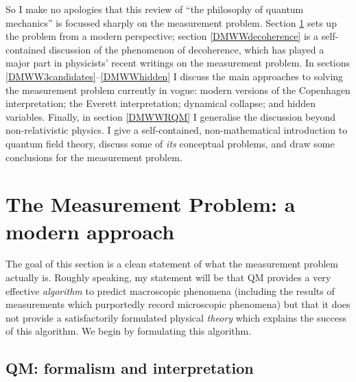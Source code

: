 \documentclass[12pt]{article}
\begin{document}
So I make no apologies that this review of ``the philosophy of quantum mechanics'' is focussed sharply on the measurement problem. Section \ref{DMWWproblem} sets up the problem from a modern perspective; section   \ref{DMWWdecoherence} is a self-contained discussion of the phenomenon of decoherence, which has played a major part in physicists' recent writings on the measurement problem. In sections \ref{DMWW3candidates}--\ref{DMWWhidden} I discuss the main approaches to solving the measurement problem currently in vogue: modern versions of the Copenhagen interpretation; the Everett interpretation; dynamical collapse; and hidden variables. Finally, in section \ref{DMWWRQM} I generalise the discussion beyond non-relativistic physics. I give a self-contained, non-mathematical introduction to quantum field theory, discuss some of \emph{its} conceptual problems, and draw some conclusions for the measurement problem.

\section{The Measurement Problem: a modern approach}\label{DMWWproblem}

The goal of this section is a clean statement of what the measurement problem actually is. Roughly speaking, my statement will be that QM provides a very effective \emph{algorithm} to predict macroscopic phenomena (including the results of measurements which purportedly record microscopic phenomena) but that it does not provide a satisfactorily formulated physical \emph{theory} which explains the success of this algorithm. We begin by formulating this algorithm.

\subsection{QM: formalism and interpretation}\label{DMWWquantumalgorithm}
\end{document}
